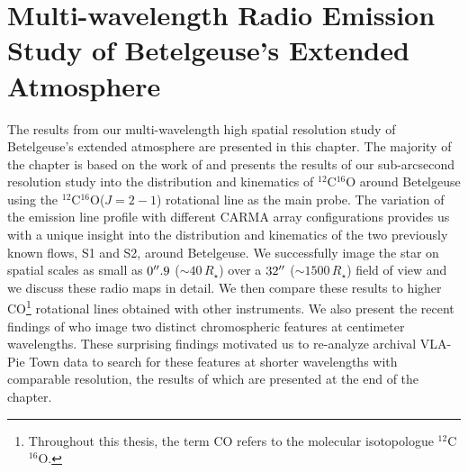
\chapter{Multi-wavelength Radio Emission Study of Betelgeuse's Extended Atmosphere} \label{chap:5}

The results from our multi-wavelength high spatial resolution study of Betelgeuse's extended atmosphere are presented in this chapter. The majority of the chapter is based on the work of \cite{ogorman_2012} and presents the results of our sub-arcsecond resolution study into the distribution and kinematics of $^{12}$C$^{16}$O around Betelgeuse using the $^{12}$C$^{16}$O($J=2-1$) rotational line as the main probe. The variation of the emission line profile with different CARMA array configurations provides us with a unique insight into the distribution and kinematics of the two previously known flows, S1 and S2, around Betelgeuse. We successfully image the star on spatial scales as small as $0^{\prime\prime} .9$ ($\sim 40\,R_{\star}$) over a $32^{\prime\prime}$ ($\sim 1500\,R_{\star}$) field of view and we discuss these radio maps in detail. We then compare these results to higher CO\footnote{Throughout this thesis, the term CO refers to the molecular isotopologue $^{12}$C$^{16}$O.} rotational lines obtained with other instruments. We also present the recent findings of \cite{richards_2013} who image two distinct chromospheric features at centimeter wavelengths. These surprising findings motivated us to re-analyze archival VLA-Pie Town data to search for these features at shorter wavelengths with comparable resolution, the results of which are presented at the end of the chapter. 

